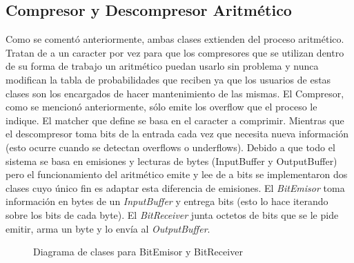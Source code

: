 \subsection{Compresor y Descompresor Aritmético}
Como se comentó anteriormente, ambas clases extienden del proceso aritmético. Tratan de a un caracter por vez para que los compresores que se utilizan dentro de su forma de trabajo un aritmético puedan usarlo sin problema y nunca modifican la tabla de probabilidades que reciben ya que los usuarios de estas clases son los encargados de hacer mantenimiento de las mismas.
El Compresor, como se mencionó anteriormente, sólo emite los overflow que el proceso le indique. El matcher que define se basa en el caracter a comprimir. Mientras que el descompresor toma bits de la entrada cada vez que necesita nueva información (esto ocurre cuando se detectan overflows o underflows).
Debido a que todo el sistema se basa en emisiones y lecturas de bytes (InputBuffer y OutputBuffer) pero el funcionamiento del aritmético emite y lee de a bits se implementaron dos clases cuyo único fin es adaptar esta diferencia de emisiones. El \textit{BitEmisor} toma información en bytes de un \textit{InputBuffer} y entrega bits (esto lo hace iterando sobre los bits de cada byte). El \textit{BitReceiver} junta octetos de bits que se le pide emitir, arma un byte y lo envía al \textit{OutputBuffer}.
\begin{figure}[!htp]
\centering
{}
	\caption{Diagrama de clases para BitEmisor y BitReceiver}
\end{figure}

